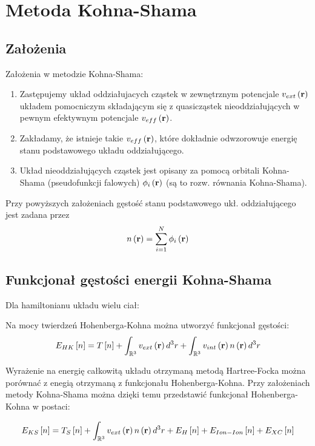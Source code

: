 \newpage
\section{Metoda Kohna-Shama}


\subsection{Założenia}

Założenia w metodzie Kohna-Shama:
\begin{enumerate}
\item Zastępujemy układ oddziałujacych cząstek w zewnętrznym potencjale
$v_{ext}\left({\bf r}\right)$ układem pomocniczym składającym się
z quasicząstek nieoddziałujących w pewnym efektywnym potencjale $v_{eff}\left({\bf r}\right)$.
\item Zakładamy, że istnieje takie $v_{eff}\left({\bf r}\right)$, które
dokładnie odwzorowuje energię stanu podstawowego układu oddziałującego.
\item Układ nieoddziałujących cząstek jest opisany za pomocą orbitali Kohna-Shama
(pseudofunkcji falowych) $\phi_{i}\left({\bf r}\right)$ (są to rozw.
równania Kohna-Shama).
\end{enumerate}
Przy powyższych założeniach gęstość stanu podstawowego ukł. oddziałującego
jest zadana przez
\[
n\left({\bf r}\right)=\sum_{i=1}^{N}\phi_{i}\left({\bf r}\right)
\]



\subsection{Funkcjonał gęstości energii Kohna-Shama}

Dla hamiltonianu układu wielu ciał:

Na mocy twierdzeń Hohenberga-Kohna można utworzyć funkcjonał gęstości:
\[
E_{HK}\left[n\right]=T\left[n\right]+\int_{\mathbb{R}^{3}}v_{ext}\left({\bf r}\right)d^{3}r+\int_{\mathbb{R}^{3}}v_{int}\left({\bf r}\right)n\left({\bf r}\right)d^{3}r
\]

Wyrażenie na energię całkowitą układu otrzymaną metodą Hartree-Focka można porównać z enegią otrzymaną z funkcjonału Hohenberga-Kohna. Przy założeniach metody Kohna-Shama można dzięki temu przedstawić funkcjonał Hohenberga-Kohna w postaci:

\[
E_{KS}\left[n\right]=T_{S}\left[n\right]+\int_{\mathbb{R}^{3}}v_{ext}\left({\bf r}\right)n\left({\bf r}\right)d^{3}r+E_{H}\left[n\right]+E_{Ion-Ion}\left[n\right]+E_{XC}\left[n\right]
\]

